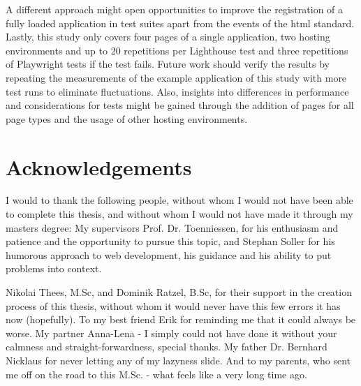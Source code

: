 \documentclass[a4paper, 12pt]{article}
\makeatletter
\renewcommand\lstlistoflistings{
  \section{\lstlistlistingname}
  \@starttoc{lol}%
}
\makeatother
\begin{document}
A different approach might open opportunities to improve the registration of a fully loaded application in test suites apart from the events of the \acrshort{html} standard.
Lastly, this study only covers four pages of a single application, two hosting environments and up to 20 repetitions per Lighthouse test and three repetitions of Playwright tests if the test fails.
Future work should verify the results by repeating the measurements of the example application of this study with more test runs to eliminate fluctuations.
Also, insights into differences in performance and considerations for tests might be gained through the addition of pages for all page types and the usage of other hosting environments. 

\pagebreak

\appendix

\section{Acknowledgements}

I would to thank the following people, without whom I would not have been able to complete this thesis, and without whom I would not have made it through my masters degree:
My supervisors Prof. Dr. Toenniessen, for his enthusiasm and patience and the opportunity to pursue this topic, and Stephan Soller for his humorous approach to web development, his guidance and his ability to put problems into context.

Nikolai Thees, M.Sc, and Dominik Ratzel, B.Sc, for their support in the creation process of this thesis, without whom it would never have this few errors it has now (hopefully).
To my best friend Erik for reminding me that it could always be worse.
My partner Anna-Lena - I simply could not have done it without your calmness and straight-forwardness, special thanks.
My father Dr. Bernhard Nicklaus for never letting any of my lazyness slide.
And to my parents, who sent me off on the road to this M.Sc. - what feels like a very long time ago.

\lstlistoflistings

\pagebreak

\end{document}
